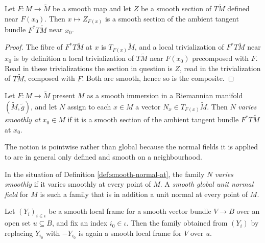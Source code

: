 \begin{lemma}
\label{lem:pullback-comp-section}
\leanok
{}
Let $F : M \to \tilde M$ be a smooth map and let $Z$ be a smooth section of $T\tilde M$ defined
near $F(x_0)$. Then $x \mapsto Z_{F(x)}$ is a smooth section of the ambient tangent bundle
$F^* T\tilde M$ near $x_0$.
\end{lemma}

\begin{proof}
\leanok
{}
The fibre of $F^* T\tilde M$ at $x$ is $T_{F(x)}\tilde M$, and a local trivialization of
$F^* T\tilde M$ near $x_0$ is by definition a local trivialization of $T\tilde M$ near $F(x_0)$
precomposed with $F$. Read in these trivializations the section in question is $Z$, read in the
trivialization of $T\tilde M$, composed with $F$. Both are smooth, hence so is the composite.
\end{proof}

\begin{definition}
\label{def:smooth-normal-at}
\leanok
{}
Let $F : M \to \tilde M$ present $M$ as a smooth immersion in a Riemannian manifold
$(\tilde M, \tilde g)$, and let $N$ assign to each $x \in M$ a vector $N_x \in T_{F(x)}\tilde M$.
Then $N$ \emph{varies smoothly at} $x_0 \in M$ if it is a smooth section of the ambient tangent
bundle $F^* T\tilde M$ at $x_0$.

The notion is pointwise rather than global because the normal fields it is applied to are in
general only defined and smooth on a neighbourhood.
\end{definition}

\begin{definition}
\label{def:smooth-unit-normal-field}
\leanok
{}
In the situation of Definition \ref{def:smooth-normal-at}, the family $N$ \emph{varies smoothly}
if it varies smoothly at every point of $M$. A \emph{smooth global unit normal field} for $M$ is
such a family that is in addition a unit normal at every point of $M$.
\end{definition}

\begin{lemma}
\label{lem:frame-neg-member}
\leanok
Let $(Y_i)_{i \in \iota}$ be a smooth local frame for a smooth vector bundle $V \to B$ over an
open set $u \subseteq B$, and fix an index $i_0 \in \iota$. Then the family obtained from $(Y_i)$
by replacing $Y_{i_0}$ with $-Y_{i_0}$ is again a smooth local frame for $V$ over $u$.
\end{lemma}

